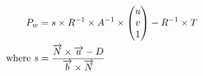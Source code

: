 \begin{align}
	\label{equation:3dobjectpoint}				
	P_w &= s \times R^{-1} 
 					 \times A^{-1} 
					 \times \begin{pmatrix}
								  u \\
								  v \\
								  1 \\
								 \end{pmatrix}
					- R^{-1} \times T \\
	\text{where}~	
	s &= \frac{\overrightarrow{N}\times\overrightarrow{a} - D}
						{\overrightarrow{b}\times\overrightarrow{N}} \notag
\end{align}